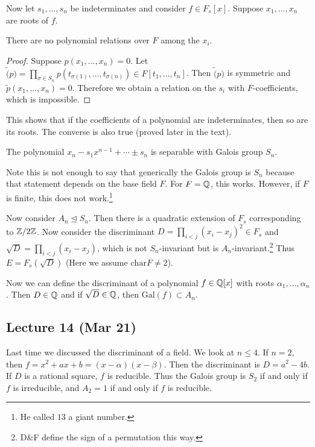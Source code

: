\documentclass[10pt, twoside]{article}
\begin{document}
        Now let $s_1, \ldots, s_n$ be indeterminates and consider $f \in F_s[x]$. Suppose $x_1, \ldots, x_n$ are roots of $f$. 

        \begin{prop}
            There are no polynomial relations over $F$ among the $x_i$.
            \begin{proof}
                Suppose $p(x_1, \ldots, x_n) = 0$. Let $\widetilde(p) = \prod_{\sigma \in S_n} p(t_{\sigma(1)}, \ldots, t_{\sigma(n)}) \in F[t_1, \ldots, t_n]$. Then $\widetilde(p)$ is symmetric and $\widetilde{p}(x_1, \ldots, x_n) = 0$. Therefore we obtain a relation on the $s_i$ with $F$-coefficients, which is impossible. 
            \end{proof}
        \end{prop}

        This shows that if the coefficients of a polynomial are indeterminates, then so are its roots. The converse is also true (proved later in the text).

        \begin{thm}
            The polynomial $x_n - s_1x^{n-1} + \cdots \pm s_n$ is separable with Galois group $S_n$.
        \end{thm}

        Note this is not enough to say that generically the Galois group is $S_n$ because that statement depends on the base field $F$. For $F = \mathbb{Q}$, this works. However, if $F$ is finite, this does not work.\footnote{He called $13$ a giant number.}

        Now consider $A_n \trianglelefteq S_n$. Then there is a quadratic extension of $F_s$ corresponding to $\mathbb{Z}/2\mathbb{Z}$. Now consider the discriminant $D = \prod_{i<j} (x_i-x_j)^2 \in F_s$ and $\sqrt{D} = \prod_{i<j} (x_i-x_j)$, which is not $S_n$-invariant but is $A_n$-invariant.\footnote{D\&F define the sign of a permutation this way.} Thus $E = F_s(\sqrt{D})$ (Here we assume $\mathrm{char} F \neq 2$). 

        Now we can define the discriminant of a polynomial $f \in \mathbb{Q}[x]$ with roots $\alpha_1, \ldots, \alpha_n$. Then $D \in \mathbb{Q}$ and if $\sqrt{D} \in \mathbb{Q}$, then $\mathrm{Gal}(f) \subset A_n$.

        \subsection{Lecture 14 (Mar 21)}

        Last time we discussed the discriminant of a field. We look at $n \leq 4$. If $n = 2$, then $f = x^2 + ax + b = (x-\alpha)(x - \beta)$. Then the discriminant is $D = a^2 - 4b$. If $D$ is a rational square, $f$ is reducible. Thus the Galois group is $S_2$ if and only if $f$ is irreducible, and $A_2 = 1$ if and only if $f$ is reducible.
\end{document}
